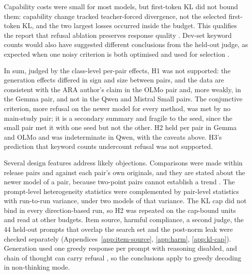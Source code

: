 Capability costs were small for most models, but first-token KL did not bound
them: capability change tracked teacher-forced divergence, not the selected
first-token KL, and the two largest losses occurred inside the budget. This
qualifies the report that refusal ablation preserves response quality
\cite{dombrowski2025safety}. Dev-set keyword counts would also have suggested
different conclusions from the held-out judge, as expected when one noisy
criterion is both optimised and used for selection
\cite{cawley2010overfitting}.

In sum, judged by the class-level per-pair effects, H1 was not supported:
the generation effects differed in sign and size between pairs, and the data
are consistent with the ARA author's claim in the OLMo pair and, more weakly,
in the Gemma pair, and not in the Qwen and Mistral Small pairs. The conjunctive
criterion, more refusal on the newer model for every method, was met by no
main-study pair; it is a secondary summary and fragile to the seed, since the
small pair met it with one seed but not the other. H2 held per pair in Gemma
and OLMo and was indeterminate in Qwen, with the caveats above. H3's
prediction that keyword counts undercount refusal was not supported.

Several design features address likely objections. Comparisons were made
within release pairs and against each pair's own originals, and they are
stated about the newer model of a pair, because two-point pairs cannot
establish a trend \cite{mitra2026cross}. The prompt-level heterogeneity
statistics were complemented by pair-level statistics with run-to-run
variance, under two models of that variance. The KL cap did not bind in every
direction-based run, so H2 was repeated on the cap-bound units and read at
other budgets. Item source, harmful compliance, a second judge, the 44
held-out prompts that overlap the search set and the post-norm leak were
checked separately (Appendices~\ref{app:item-source}, \ref{app:harm},
\ref{app:kl-cap}). Generation used one greedy response per prompt with
reasoning disabled, and chain of thought can carry refusal
\cite{yang2026beyond}, so the conclusions apply to greedy decoding in
non-thinking mode.

